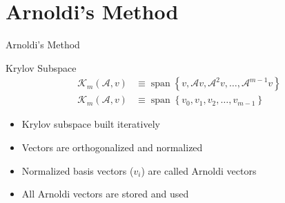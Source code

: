 \documentclass[xcolor={usenames, dvipsnames},]{beamer}
\newcommand{\A}{\ensuremath{\mathcal{A}}}
\DeclareMathOperator{\mathspan}{span}
\begin{document}
\section{Arnoldi's Method}
\begin{frame}{Arnoldi's Method}
    \begin{block}{Krylov Subspace}
        \begin{align*}
            \mathcal{K}_m(\A, v) &\equiv \mathspan\left\{v, \A v, \A^2v, \ldots, \A^{m-1}v\right\} \\[0.5em]
            \mathcal{K}_m(\A, v) &\equiv \mathspan\left\{v_0, v_1, v_2, \ldots, v_{m-1}\right\}
        \end{align*}
    \end{block}
        \begin{itemize}
            \item Krylov subspace built iteratively
            \item Vectors are orthogonalized and normalized
            \item Normalized basis vectors ($v_i$) are called Arnoldi vectors
            \item All Arnoldi vectors are stored and used
        \end{itemize}
\end{frame}
\end{document}
